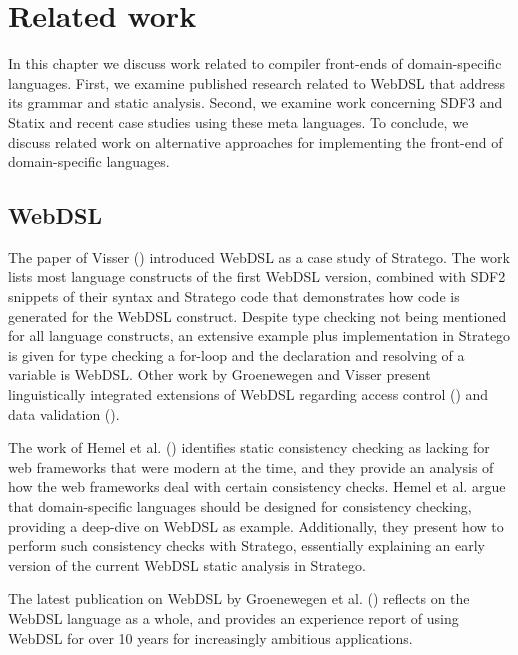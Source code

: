 
\chapter{\label{chap:related-work}Related work}

  In this chapter we discuss work related to compiler front-ends of domain-specific languages. First, we examine published research related to WebDSL that address its grammar and static analysis. Second, we examine work concerning SDF3 and Statix and recent case studies using these meta languages. To conclude, we discuss related work on alternative approaches for implementing the front-end of domain-specific languages.

  \section{WebDSL}

    The paper of Visser (\citeyear{Visser2007}) introduced WebDSL as a case study of Stratego. The work lists most language constructs of the first WebDSL version, combined with SDF2 snippets of their syntax and Stratego code that demonstrates how code is generated for the WebDSL construct. Despite type checking not being mentioned for all language constructs, an extensive example plus implementation in Stratego is given for type checking a for-loop and the declaration and resolving of a variable is WebDSL. Other work by Groenewegen and Visser present linguistically integrated extensions of WebDSL regarding access control (\citeyear{GroenewegenV08}) and data validation (\citeyear{GroenewegenV13}).

    The work of Hemel et al. (\citeyear{Hemel2011}) identifies static consistency checking as lacking for web frameworks that were modern at the time, and they provide an analysis of how the web frameworks deal with certain consistency checks. Hemel et al. argue that domain-specific languages should be designed for consistency checking, providing a deep-dive on WebDSL as example. Additionally, they present how to perform such consistency checks with Stratego, essentially explaining an early version of the current WebDSL static analysis in Stratego.

    The latest publication on WebDSL by Groenewegen et al. (\citeyear{Groenewegen2020}) reflects on the WebDSL language as a whole, and provides an experience report of using WebDSL for over 10 years for increasingly ambitious applications.

